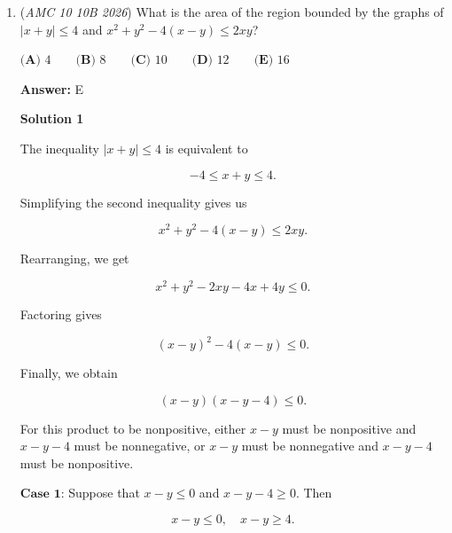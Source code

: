 \begin{enumerate}
 



\textbf{Solution 7 (Count. Them. All)}

Hey it's me again, the count them all guy. I will try to make one of these from every question where its possible so keep an eye out!

 there are exactly $\boxed{\text{(D) }22}$ different possibilities. Here are all of them:

 S \_ \_ \_ \_, \_ S \_ \_ \_, \_ \_ S \_ \_, \_ \_ \_ S \_, \_ \_ \_ \_ S, 

 S \_ S \_ \_, S \_ \_ S \_, S \_ \_ \_ S, \_ S \_ S \_, \_ S \_ \_ S, \_ \_ S \_ S, 

 S \_ S \_ S, S S \_ S \_, S \_ S S \_, S \_ \_ S S, \_ S \_ S S, \_ S S \_ S, S S \_ \_ S, 

 S \_ S S S, S S \_ S S, S S S \_ S, 

 S S S S S.

 


	\item (\textit{AMC 10 10B 2026}) What is the area of the region bounded by the graphs of $|x+y| \leq 4$ and $x^2+y^2-4(x-y) \leq 2xy$?


 $\textbf{(A) } 4 \qquad \textbf{(B) } 8 \qquad \textbf{(C) } 10 \qquad \textbf{(D) } 12 \qquad \textbf{(E) } 16$

 \textbf{Answer: }E



\textbf{Solution 1}

The inequality $|x+y| \leq 4$ is equivalent to

 
 \[-4\leq x+y\leq 4.\]

 Simplifying the second inequality gives us

 
 \[x^2+y^2-4(x-y)\leq 2xy.\]

 Rearranging, we get

 
 \[x^2+y^2-2xy-4x+4y\leq 0.\]

 Factoring gives

 
 \[(x-y)^2-4(x-y)\leq 0.\]

 Finally, we obtain

 
 \[(x-y)(x-y-4)\leq 0.\]

 For this product to be nonpositive, either $x-y$ must be nonpositive and $x-y-4$ must be nonnegative, or $x-y$ must be nonnegative and $x-y-4$ must be nonpositive.

 $\textbf{Case 1:}$ Suppose that $x-y\leq 0$ and $x-y-4\geq 0$. Then

 
 \[x-y\leq 0,\quad x-y\geq 4.\]


\end{enumerate}
